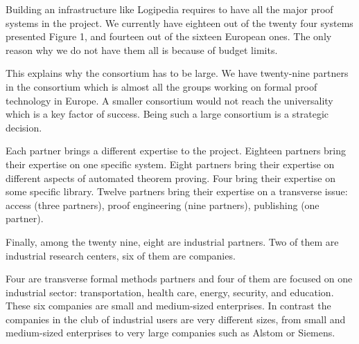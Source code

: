 Building an infrastructure like Logipedia requires to have all the
major proof systems in the project. We currently have eighteen out of
the twenty four systems presented Figure 1, and fourteen out of the
sixteen European ones.  The only reason why we do not have them all is
because of budget limits.

This explains why the consortium has to be large.  We have twenty-nine
partners in the consortium which is almost all the groups working on
formal proof technology in Europe.  A smaller consortium would not
reach the universality which is a key factor of success.  Being such a
large consortium is a strategic decision.

Each partner brings a different expertise to the project.  Eighteen
partners bring their expertise on one specific system.  Eight partners
bring their expertise on different aspects of automated theorem
proving. Four bring their expertise on some specific library. Twelve
partners bring their expertise on a transverse issue: access (three
partners), proof engineering (nine partners), publishing (one partner).


Finally, among the twenty nine, eight are industrial partners.
Two of them are industrial research centers, six of them are companies.

Four are transverse formal methods partners and four of them are
focused on one industrial sector: transportation, health care, energy,
security, and education. These six companies are small and
medium-sized enterprises. In contrast the companies in the club of
industrial users are very different sizes, from small and medium-sized
enterprises to very large companies such as Alstom or Siemens.

